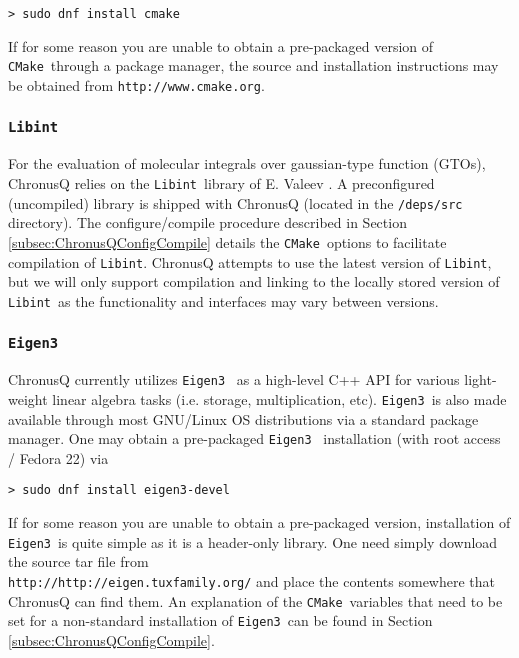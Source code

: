 \documentclass[12pt]{article}
\newcommand{\CMake}{\texttt{CMake}}
\newcommand{\Libint}{\texttt{Libint}}
\newcommand{\Eigen}{\texttt{Eigen3}}
\begin{document}
	\begin{lstlisting}
> sudo dnf install cmake
	\end{lstlisting}

	\noindent If for some reason you are unable to obtain a pre-packaged 
	version of \CMake~through a package manager, the source and installation 
	instructions may be obtained from \texttt{http://www.cmake.org}.

      \subsubsection{\Libint} \label{subsubsec:Libint}
        For the evaluation of molecular integrals over gaussian-type
        function (GTOs), ChronusQ relies on the \Libint~library of E. Valeev \cite{libint15}. A
	preconfigured (uncompiled) library is shipped with ChronusQ (located in
	the \texttt{/deps/src} directory). The configure/compile procedure
	described in Section \ref{subsec:ChronusQConfigCompile} details the
	\CMake~options to facilitate compilation of \Libint. ChronusQ attempts
	to use the latest version of \Libint, but we will only support compilation
	and linking to the locally stored version of \Libint~as the functionality
	and interfaces may vary between versions.

      \subsubsection{\Eigen} \label{subsubsec:Eigen}
        ChronusQ currently utilizes \Eigen~\cite{eigen} as a high-level C++ API for
        various light-weight linear algebra tasks (i.e. storage, multiplication,
	etc). \Eigen~is also made available through most GNU/Linux OS distributions
	via a standard package manager. One may obtain a pre-packaged \Eigen~
	installation (with root access / Fedora 22) via

	\begin{lstlisting}
> sudo dnf install eigen3-devel
	\end{lstlisting}

        \noindent If for some reason you are unable to obtain a pre-packaged 
	version, installation of \Eigen~is quite simple as it is a header-only 
	library. One need simply download the source tar file from \\
	\texttt{http://http://eigen.tuxfamily.org/} and place the contents 
	somewhere that ChronusQ can find them. An explanation of the 
	\CMake~variables that need to be set for a non-standard installation 
	of \Eigen~can be found
	in Section \ref{subsec:ChronusQConfigCompile}.
\end{document}
